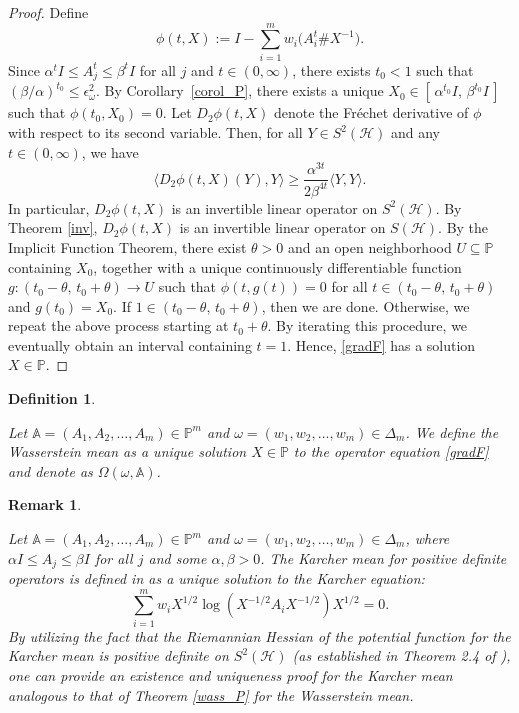 \documentclass[12pt,reqno]{amsart}
\newtheorem{Definition}[theorem]{Definition}
\newtheorem{Remark}[theorem]{Remark}
\newenvironment{remark}{\begin{Remark}\begin{em}}{\end{em}\end{Remark}}
\newenvironment{definition}{\begin{Definition}\begin{em}}{\end{em}\end{Definition}}
\begin{document}
\begin{proof}
Define
\[
\phi(t, X) := I - \sum_{i=1}^{m} w_{i} \big( A_{i}^{t} \# X^{-1} \big).
\]
Since \( \alpha^{t} I \leq A_j^{t} \leq \beta^{t} I \) for all \( j \) and \( t \in (0, \infty) \),
there exists \( t_{0} < 1 \) such that \( (\beta / \alpha)^{t_{0}} \leq \epsilon_{\omega}^{2} \).
By Corollary~\ref{corol_P}, there exists a unique
\( X_{0} \in [\, \alpha^{t_{0}} I,\, \beta^{t_{0}} I \,] \)
such that \( \phi(t_{0}, X_{0}) = 0 \).
Let \( D_{2}\phi(t, X) \) denote the Fréchet derivative of \( \phi \) with respect to its second variable.
Then, for all \( Y \in S^{2}(\mathcal{H}) \) and any \( t \in (0, \infty) \), we have
\begin{equation}\label{eq:wass_P}
\langle D_{2} \phi(t, X)(Y), Y \rangle
\geq \frac{\alpha^{3t}}{2\beta^{4t}} \langle Y, Y \rangle.
\end{equation}
In particular, \( D_{2}\phi(t, X) \) is an invertible linear operator on $S^{2}(\mathcal{H})$. By Theorem \ref{inv}, \( D_{2}\phi(t, X) \) is an invertible linear operator on $S(\mathcal{H})$.
By the Implicit Function Theorem, there exist \( \theta > 0 \)
and an open neighborhood \( U \subseteq \mathbb{P} \) containing \( X_{0} \), together with a unique continuously differentiable function
$
g : (t_{0} - \theta,\, t_{0} + \theta) \to U
$
such that \( \phi(t, g(t)) = 0 \) for all \( t \in (t_{0} - \theta,\, t_{0} + \theta) \)
and \( g(t_{0}) = X_{0} \).
If \( 1 \in (t_{0} - \theta,\, t_{0} + \theta) \), then we are done.
Otherwise, we repeat the above process starting at \( t_{0} + \theta \).
By iterating this procedure, we eventually obtain an interval containing \( t = 1 \).
Hence, \eqref{gradF} has a solution \( X \in \mathbb{P} \).
\end{proof}


\begin{definition}
Let $\mathbb{A} = (A_1, A_2, \ldots, A_m) \in \mathbb{P}^m$ and $\omega = (w_{1}, w_{2}, \dots, w_{m}) \in \Delta_{m}$. We define the Wasserstein mean as a unique solution $X \in \mathbb{P}$ to the operator equation \eqref{gradF} and denote as $\Omega (\omega, \mathbb{A})$.
\end{definition}


\begin{remark}
Let $\mathbb{A} = (A_1, A_2, \ldots, A_m) \in \mathbb{P}^m$ and $\omega = (w_1, w_2, \ldots, w_m) \in \Delta_m$, where $\alpha I \leq A_j \leq \beta I$ for all $j$ and some $\alpha, \beta > 0$. The Karcher mean for positive definite operators is defined in \cite{LL} as a unique solution to the Karcher equation:\begin{equation*} \label{Karcher-eq}\sum_{i=1}^{m} w_{i} X^{1/2} \log(X^{-1/2} A_{i} X^{-1/2}) X^{1/2} = 0.\end{equation*} By utilizing the fact that the Riemannian Hessian of the potential function for the Karcher mean is positive definite on $S^2(\mathcal{H})$ (as established in Theorem 2.4 of \cite{palfia2}), one can provide an existence and uniqueness proof for the Karcher mean analogous to that of Theorem \ref{wass_P} for the Wasserstein mean.
\end{remark}
\end{document}
